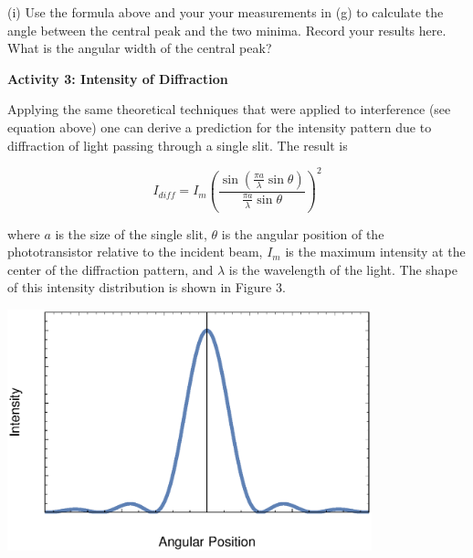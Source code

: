 (i) Use the formula above and your your measurements in (g) to calculate the
angle between the central peak and the two minima.
Record your results here.
What is the angular width of the central peak?
\vspace{25mm}



\textbf{Activity 3: Intensity of Diffraction} 

Applying the same theoretical techniques that were applied to interference
(see equation above) one can derive a prediction for the intensity
pattern due to diffraction of light passing through a single slit.
The result is 

\begin{equation} I_{diff} = I_m \left (\frac {\sin (\frac {\pi a} {\lambda} \sin \theta)} {\frac {\pi a} {\lambda} \sin \theta} \right )^2 \end{equation}

where $a$ is the size of the single slit, \( \theta  \) is the angular
position of the phototransistor relative to the incident beam, $I_{m}$
is the maximum intensity at the center of the diffraction pattern,
and \( \lambda  \) is the wavelength of the light. The shape of this
intensity distribution is shown in Figure 3.

\vspace{-0.1cm}
{\centering \includegraphics[height=2.75in]{diffraction/diffractionFig2.eps} \par}
\vspace{0.1cm}

